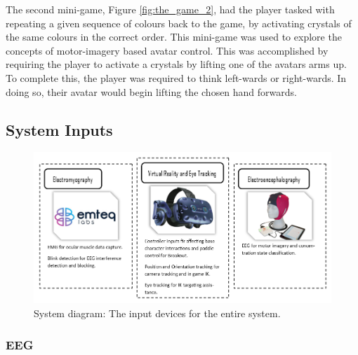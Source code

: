 \documentclass[11pt, a4paper]{article}
\newcommand{\reffigure}[1]{Figure \ref{#1}}
\begin{document}
\hfill

The second mini-game, \reffigure{fig:the_game_2}, had the player tasked with repeating a given sequence of colours back to the game, by activating crystals of the same colours in the correct order. This mini-game was used to explore the concepts of motor-imagery based avatar control. This was accomplished by requiring the player to activate a crystals by lifting one of the avatars arms up. To complete this, the player was required to think left-wards or right-wards. In doing so, their avatar would begin lifting the chosen hand forwards. 






\pagebreak
\subsection{System Inputs}	



\begin{figure}[H]
	\centering
	\includegraphics[width = 0.9 \linewidth] {[ Figures ]/System Diagram - System Inputs.png}
	\captionsetup{font = small, labelfont = small, width=.8\linewidth}
	\caption{System diagram: The input devices for the entire system.}
	\label{fig:system_diagram_:_inputs}
\end{figure}


\subsubsection{EEG}	
\end{document}
